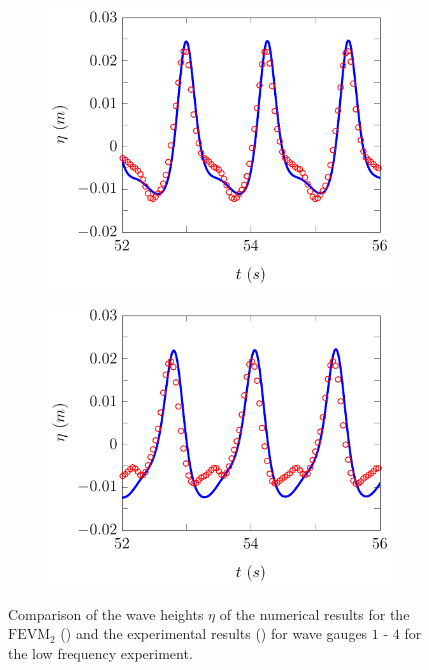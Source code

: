 \begin{figure}
\begin{subfigure}{0.5\textwidth}
	\end{subfigure}
	\begin{subfigure}{0.5\textwidth}
		\includegraphics[width=\textwidth]{./chp6/figures/Experiment/Beji/sh/FEVMWG3.pdf}
		\vspace{0.5cm}
	\end{subfigure}%
	\begin{subfigure}{0.5\textwidth}
		\includegraphics[width=\textwidth]{./chp6/figures/Experiment/Beji/sh/FEVMWG4.pdf}
		\vspace{0.5cm}
	\end{subfigure}
	\caption{Comparison of the wave heights $\eta$ of the numerical results for the $\text{FEVM}_2$ ({\color{blue}\solidrule}) and the experimental results () for wave gauges $1$ - $4$ for the low frequency experiment.}
	\label{fig:BejishWG1to4FEVM}
\end{figure}

